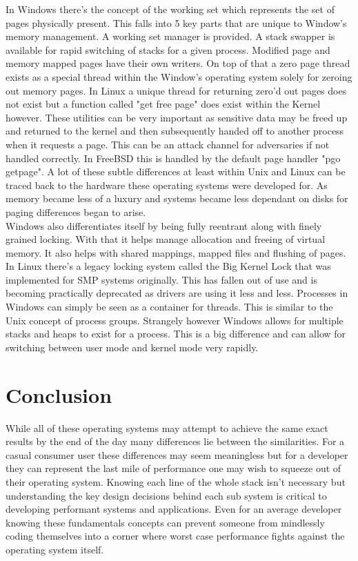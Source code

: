 \documentclass[letterpaper,10pt,draftclsnofoot,onecolumn]{IEEEtran}
\begin{document}
In Windows there's the concept of the working set which represents the set of pages physically present. This falls into 5 key parts that are unique to Window’s memory management. A working set manager is provided. A stack swapper is available for rapid switching of stacks for a given process. Modified page and memory mapped pages have their own writers. On top of that a zero page thread exists as a special thread within the Window’s operating system solely for zeroing out memory pages. In Linux a unique thread for returning zero’d out pages does not exist but a function called "get free page" does exist within the Kernel however. \cite{love} These utilities can be very important as sensitive data may be freed up and returned to the kernel and then subsequently handed off to another process when it requests a page. This can be an attack channel for adversaries if not handled correctly. In FreeBSD this is handled by the default page handler "pgo getpage". \cite{mccusick} A lot of these subtle differences at least within Unix and Linux can be traced back to the hardware these operating systems were developed for. As memory became less of a luxury and systems became less dependant on disks for paging differences began to arise.\\

Windows also differentiates itself by being fully reentrant along with finely grained locking. With that it helps manage allocation and freeing of virtual memory. It also helps with shared mappings, mapped files and flushing of pages. In Linux there's a legacy locking system called the Big Kernel Lock that was implemented for SMP systems originally. This has fallen out of use and is becoming practically deprecated as drivers are using it less and less. \cite{love} Processes in Windows can simply be seen as a container for threads. This is similar to the Unix concept of process groups. Strangely however Windows allows for multiple stacks and heaps to exist for a process. This is a big difference and can allow for switching between user mode and kernel mode very rapidly.\\

\section{Conclusion}
While all of these operating systems may attempt to achieve the same exact results by the end of the day many differences lie between the similarities. For a casual consumer user these differences may seem meaningless but for a developer they can represent the last mile of performance one may wish to squeeze out of their operating system. Knowing each line of the whole stack isn’t necessary but understanding the key design decisions behind each sub system is critical to developing performant systems and applications. Even for an average developer knowing these fundamentals concepts can prevent someone from mindlessly coding themselves into a corner where worst case performance fights against the operating system itself.\\



\end{document}

